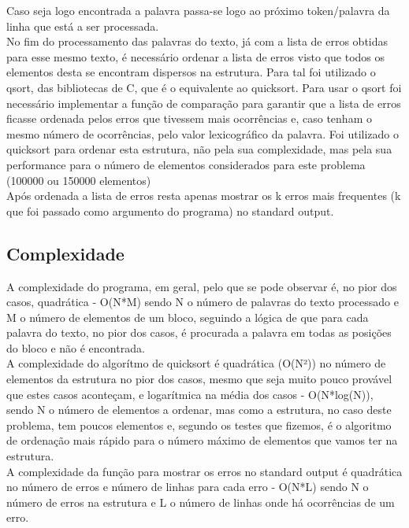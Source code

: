 Caso seja logo encontrada a palavra passa-se logo ao próximo token/palavra da linha que está a ser processada.\\

No fim do processamento das palavras do texto, já com a lista de erros obtidas para esse mesmo texto, é necessário ordenar a lista de erros visto que todos os elementos desta se encontram dispersos na estrutura. Para tal foi utilizado o qsort, das bibliotecas de C, que é o equivalente ao quicksort. Para usar o qsort foi necessário implementar a função de comparação para garantir que a lista de erros ficasse ordenada pelos erros que tivessem mais ocorrências e, caso tenham o mesmo número de ocorrências, pelo valor lexicográfico da palavra. Foi utilizado o quicksort para ordenar esta estrutura, não pela sua complexidade, mas pela sua performance para o número de elementos considerados para este problema (100000 ou 150000 elementos)\\

Após ordenada a lista de erros resta apenas mostrar os k erros mais frequentes (k que foi passado como argumento do programa) no standard output.

\newpage
\subsection{Complexidade}

A complexidade do programa, em geral, pelo que se pode observar é, no pior dos casos, quadrática - O(N*M) sendo N o número de palavras do texto processado e M o número de elementos de um bloco, seguindo a lógica de que para cada palavra do texto, no pior dos casos, é procurada a palavra em todas as posições do bloco e não é encontrada.\\

A complexidade do algorítmo de quicksort é quadrática (O(N²)) no número de elementos da estrutura no pior dos casos, mesmo que seja muito pouco provável que estes casos aconteçam, e logarítmica na média dos casos - O(N*log(N)), sendo N o número de elementos a ordenar, mas como a estrutura, no caso deste problema, tem poucos elementos e, segundo os testes que fizemos, é o algoritmo de ordenação mais rápido para o número máximo de elementos que vamos ter na estrutura.\\

A complexidade da função para mostrar os erros no standard output é quadrática no número de erros e número de linhas para cada erro - O(N*L) sendo N o número de erros na estrutura e L o número de linhas onde há ocorrências de um erro.\\

